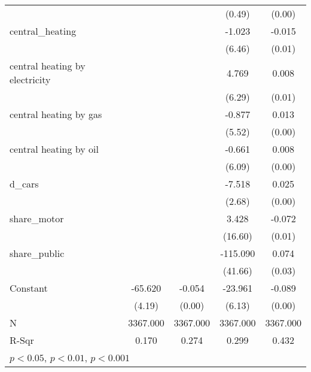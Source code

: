 \begin{table}[htbp]
\begin{tabular}{l*{4}{c}}
                    &                     &                     &      (0.49)         &      (0.00)         \\
central\_heating     &                     &                     &      -1.023         &      -0.015\sym{**} \\
                    &                     &                     &      (6.46)         &      (0.01)         \\
central heating by electricity&                     &                     &       4.769         &       0.008         \\
                    &                     &                     &      (6.29)         &      (0.01)         \\
central heating by gas&                     &                     &      -0.877         &       0.013\sym{**} \\
                    &                     &                     &      (5.52)         &      (0.00)         \\
central heating by oil&                     &                     &      -0.661         &       0.008         \\
                    &                     &                     &      (6.09)         &      (0.00)         \\
d\_cars              &                     &                     &      -7.518\sym{**} &       0.025\sym{***}\\
                    &                     &                     &      (2.68)         &      (0.00)         \\
share\_motor         &                     &                     &       3.428         &      -0.072\sym{***}\\
                    &                     &                     &     (16.60)         &      (0.01)         \\
share\_public        &                     &                     &    -115.090\sym{**} &       0.074\sym{*}  \\
                    &                     &                     &     (41.66)         &      (0.03)         \\
Constant            &     -65.620\sym{***}&      -0.054\sym{***}&     -23.961\sym{***}&      -0.089\sym{***}\\
                    &      (4.19)         &      (0.00)         &      (6.13)         &      (0.00)         \\
\hline
N                   &    3367.000         &    3367.000         &    3367.000         &    3367.000         \\
R-Sqr               &       0.170         &       0.274         &       0.299         &       0.432         \\
\hline\hline
\multicolumn{5}{l}{\footnotesize \sym{*} \(p<0.05\), \sym{**} \(p<0.01\), \sym{***} \(p<0.001\)}\\
\end{tabular}
\end{table}
